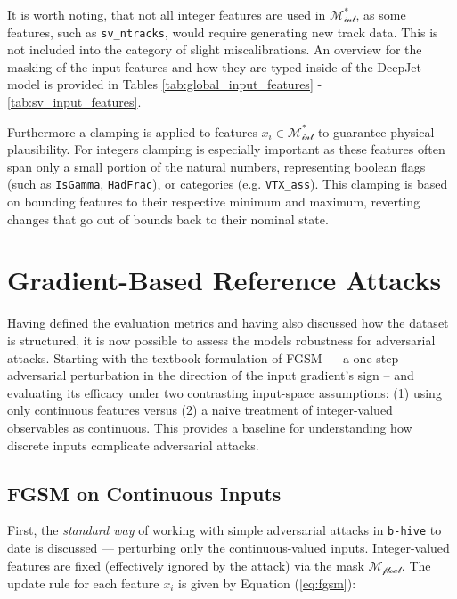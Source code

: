 It is worth noting, that not all integer features are used in $\mathcal{M_{\text{int}}^*}$, as some features, such as \texttt{sv\_ntracks}, would require generating new track data. This is not included into the category of slight miscalibrations.
An overview for the masking of the input features and how they are typed inside of the DeepJet model is provided in Tables \ref{tab:global_input_features} - \ref{tab:sv_input_features}.

Furthermore a clamping is applied to features $x_i\in\mathcal{M_{\text{int}}^*}$ to guarantee physical plausibility. For integers clamping is especially important as these features often span only a small portion of the natural numbers, representing boolean flags (such as \texttt{IsGamma}, \texttt{HadFrac}), or categories (e.g. \texttt{VTX\_ass}). This clamping is based on bounding features to their respective minimum and maximum, reverting changes that go out of bounds back to their nominal state.





\section{Gradient-Based Reference Attacks}
Having defined the evaluation metrics and having also discussed how the dataset is structured, it is now possible to assess the models robustness for adversarial attacks. Starting with the textbook formulation of FGSM — a one-step adversarial perturbation in the direction of the input gradient’s sign \cite{goodfellow2015explainingharnessingadversarialexamples} – and evaluating its efficacy under two contrasting input-space assumptions: (1) using only continuous features versus (2) a naive treatment of integer-valued observables as continuous. This provides a baseline for understanding how discrete inputs complicate adversarial attacks.

\subsection{FGSM on Continuous Inputs}
\label{sec:fgsm_methodology}

First, the \textit{standard way} of working with simple adversarial attacks in \texttt{b-hive} to date is discussed — perturbing only the continuous-valued inputs. Integer-valued features are fixed (effectively ignored by the attack) via the mask $\mathcal{M_{\text{float}}}$. The update rule for each feature $x_i$ is given by Equation (\ref{eq:fgsm}):


